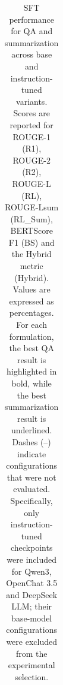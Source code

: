 \begin{table}[ht]
\begin{tabular}{lcccccc|cccccc}
\bottomrule
\end{tabular}
\caption{SFT performance for QA and summarization across base and instruction-tuned variants. Scores are reported for ROUGE-1 (R1), ROUGE-2 (R2), ROUGE-L (RL), ROUGE-Lsum (RL\_Sum), BERTScore F1 (BS) and the Hybrid metric (Hybrid). Values are expressed as percentages. For each formulation, the best QA result is highlighted in bold, while the best summarization result is underlined. Dashes (--) indicate configurations that were not evaluated. Specifically, only instruction-tuned checkpoints were included for Qwen3, OpenChat 3.5 and DeepSeek LLM; their base-model configurations were excluded from the experimental selection.}
\label{tab:results-sft}
\end{table}

